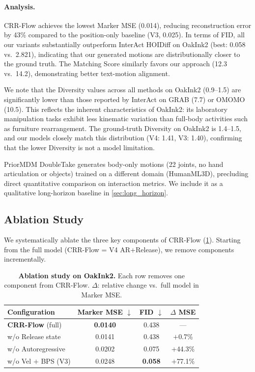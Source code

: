 \paragraph{Analysis.}
CRR-Flow achieves the lowest Marker MSE (0.014), reducing reconstruction error by 43\% compared to the position-only baseline (V3, 0.025).
In terms of FID, all our variants substantially outperform InterAct HOIDiff on OakInk2 (best: 0.058 vs.\ 2.821), indicating that our generated motions are distributionally closer to the ground truth.
The Matching Score similarly favors our approach (12.3 vs.\ 14.2), demonstrating better text-motion alignment.

We note that the Diversity values across all methods on OakInk2 (0.9--1.5) are significantly lower than those reported by InterAct on GRAB (7.7) or OMOMO (10.5).
This reflects the inherent characteristics of OakInk2: its laboratory manipulation tasks exhibit less kinematic variation than full-body activities such as furniture rearrangement.
The ground-truth Diversity on OakInk2 is 1.4--1.5, and our models closely match this distribution (V4: 1.41, V3: 1.40), confirming that the lower Diversity is not a model limitation.

PriorMDM DoubleTake generates body-only motions (22 joints, no hand articulation or objects) trained on a different domain (HumanML3D), precluding direct quantitative comparison on interaction metrics.
We include it as a qualitative long-horizon baseline in \cref{sec:long_horizon}.


\subsection{Ablation Study}
\label{sec:ablation}

We systematically ablate the three key components of CRR-Flow (\cref{tab:ablation}).
Starting from the full model (CRR-Flow = V4 AR+Release), we remove components incrementally.

\begin{table}[t]
  \caption{\textbf{Ablation study on OakInk2.} Each row removes one component from CRR-Flow. $\Delta$: relative change vs.\ full model in Marker MSE.}
  \label{tab:ablation}
  \centering
  \small
  \begin{tabular}{@{}lccc@{}}
    \toprule
    Configuration & Marker MSE $\downarrow$ & FID $\downarrow$ & $\Delta$ MSE \\
    \midrule
    \textbf{CRR-Flow} (full) & \textbf{0.0140} & 0.438 & --- \\
    \quad w/o Release state & 0.0141 & 0.438 & $+$0.7\% \\
    \quad w/o Autoregressive & 0.0202 & 0.075 & $+$44.3\% \\
    \quad w/o Vel $+$ BPS (V3) & 0.0248 & \textbf{0.058} & $+$77.1\% \\
    \bottomrule
  \end{tabular}
\end{table}

